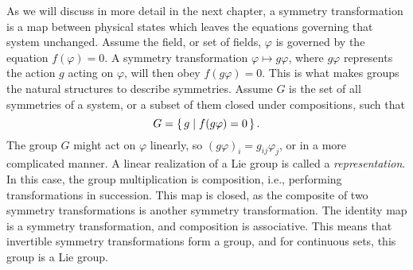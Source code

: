 As we will discuss in more detail in the next chapter, a symmetry transformation is a map between physical states which leaves the equations governing that system unchanged.
Assume the field, or set of fields, $\varphi$ is governed by the equation $f(\varphi) = 0$.
A symmetry transformation $\varphi \mapsto g \varphi$, where $g\varphi$ represents the action $g$ acting on $\varphi$, will then obey $f(g\varphi) = 0$.
This is what makes groups the natural structures to describe symmetries.
Assume $G$ is the set of all symmetries of a system, or a subset of them closed under compositions, such that
%
\begin{equation}
    G = \left\{\, g \mid f(g\varphi) = 0 \,\right\}.
\end{equation}
%
The group $G$ might act on $\varphi$ linearly, so $(g\varphi)_i = g_{ij}\varphi_j$, or in a more complicated manner.
A linear realization of a Lie group is called a \emph{representation}.
In this case, the group multiplication is composition, i.e., performing transformations in succession.
This map is closed, as the composite of two symmetry transformations is another symmetry transformation.
The identity map is a symmetry transformation, and composition is associative.
This means that invertible symmetry transformations form a group, and for continuous sets, this group is a Lie group.

